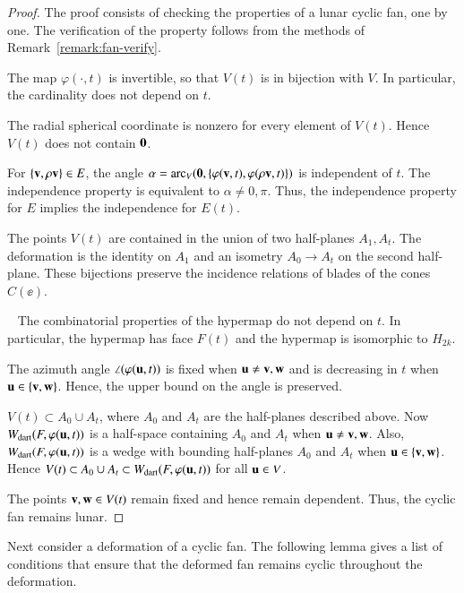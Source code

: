 \begin{proof}  The proof consists of checking  the properties of a lunar cyclic fan, one by one.   The verification of the property  follows from the methods of Remark~\ref{remark:fan-verify}.

The map $\varphi(\cdot,t)$ is invertible, so that $V(t)$ is in bijection with $V$.  In particular, the cardinality does not depend on $t$.

 The radial spherical coordinate is nonzero for every element of $V(t)$.  Hence $V(t)$ does not contain ${\mathbf 0}$.

  For $\{{\mathbf v},\rho {\mathbf v}\}\in E$, the angle 
$\alpha={\operatorname{arc}}_V({\mathbf 0},\{\varphi({\mathbf v},t),\varphi(\rho {\mathbf v},t)\})$
is independent of $t$.  The independence property is equivalent to $\alpha\ne0,\pi$.  Thus, the independence property for $E$ implies
the independence for $E(t)$.

 The points $V(t)$ are contained in the union of two half-planes $A_1,A_t$.  The deformation is the identity on $A_1$ and an isometry $A_0\to A_t$ on the second half-plane.  These bijections preserve the incidence relations of blades of the cones $C(\ee)$.  

~ The combinatorial properties of the hypermap do not depend on $t$.  In particular, the hypermap has face $F(t)$ and the hypermap is isomorphic to $H_{2k}$.

 The azimuth angle $\angle(\varphi({\mathbf u},t))$ is fixed when ${\mathbf u}\ne {\mathbf v},{\mathbf w}$ and is decreasing in $t$ when ${\mathbf u}\in \{{\mathbf v},{\mathbf w}\}$.  Hence, the upper bound on the angle is preserved.

  $V(t)\subset A_0\cup A_t$, where $A_0$ and $A_t$ are the
half-planes described above.  Now $W_{\text{dart}}(F,\varphi({\mathbf u},t))$ is a half-space containing $A_0$ and $A_t$ when ${\mathbf u}\ne {\mathbf v},{\mathbf w}$.  Also, $W_{\text{dart}}(F,\varphi({\mathbf u},t))$ is a wedge with bounding half-planes $A_0$ and $A_t$ when ${\mathbf u}\in \{{\mathbf v},{\mathbf w}\}$.  Hence
$V(t)\subset A_0\cup A_t\subset W_{\text{dart}}(F,\varphi({\mathbf u},t))$ for all ${\mathbf u}\in V$.

 The points ${\mathbf v},{\mathbf w}\in V(t)$ remain fixed and hence remain dependent.  Thus, the cyclic fan remains lunar.  
\end{proof}
%

Next  consider a deformation of a cyclic fan.  The following lemma gives a list of conditions that ensure that the deformed fan remains  cyclic throughout the deformation.


